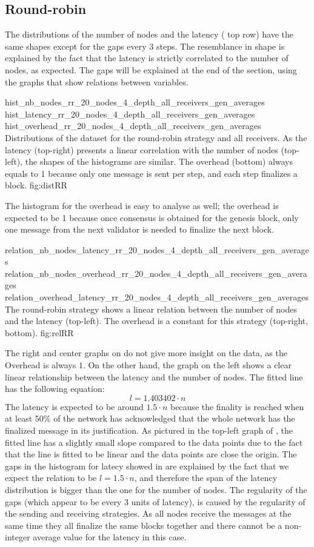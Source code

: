 \subsection{Round-robin}
\FloatBarrier
The distributions of the number of nodes and the latency
( top row) have the same
shapes except for the gaps every 3 steps. The resemblance in shape is explained
by the fact that the latency is strictly correlated to the number of nodes, as
expected.
The gaps will be explained at the end of the section, using the graphs that show
relations between variables.

\triplefigure
    {hist_nb_nodes_rr_20_nodes_4_depth_all_receivers_gen_averages}
    {hist_latency_rr_20_nodes_4_depth_all_receivers_gen_averages}
    {hist_overhead_rr_20_nodes_4_depth_all_receivers_gen_averages}
    {Distributions of the dataset for the round-robin strategy and all
    receivers. As the latency (top-right) presents a linear correlation with the number of
    nodes (top-left), the shapes of the histograms are similar. The overhead
    (bottom) always
    equals to 1 because only one message is sent per step, and each step
    finalizes a block.}
    {fig:distRR}

The histogram for the overhead is easy to analyse as well; the overhead is
expected to be 1 because once consensus is obtained for the genesis block, only
one message from the next validator is needed to finalize the next block.

\triplefigure
    {relation_nb_nodes_latency_rr_20_nodes_4_depth_all_receivers_gen_averages}
    {relation_nb_nodes_overhead_rr_20_nodes_4_depth_all_receivers_gen_averages}
    {relation_overhead_latency_rr_20_nodes_4_depth_all_receivers_gen_averages}
    {The round-robin strategy shows a linear relation between the number of
    nodes and the latency (top-left). The overhead is a constant for this
    strategy (top-right, bottom).}
    {fig:relRR}

The right and center graphs on  do not give more insight on the
data, as the Overhead is always \(1\). On the other hand, the graph on the left
shows a clear linear relationship between the latency and the number of nodes.
The fitted line has the following equation:
\[l = 1.403402\cdot n\]
The latency is expected to be around \(1.5\cdot n\) because the finality is
reached when at least 50\% of the network has acknowledged that the whole
network has the finalized message in its justification. As pictured in the
top-left graph of , the fitted line has a slightly small
slope compared to the data points due to the fact that the line is fitted to be
linear and the data points are close the origin. 
The gaps in the histogram for latecy showed in  are explained by the fact
that we expect the relation to be \(l = 1.5\cdot n\), and therefore the span of
the latency distribution is bigger than the one for the number of nodes. The
regularity of the gaps (which appear to be every 3 units of latency), is caused
by the regularity of the sending and receiving strategies. As all nodes receive
the messages at the same time they all finalize the same blocks together and
there cannot be a non-integer average value for the latency in this case.

